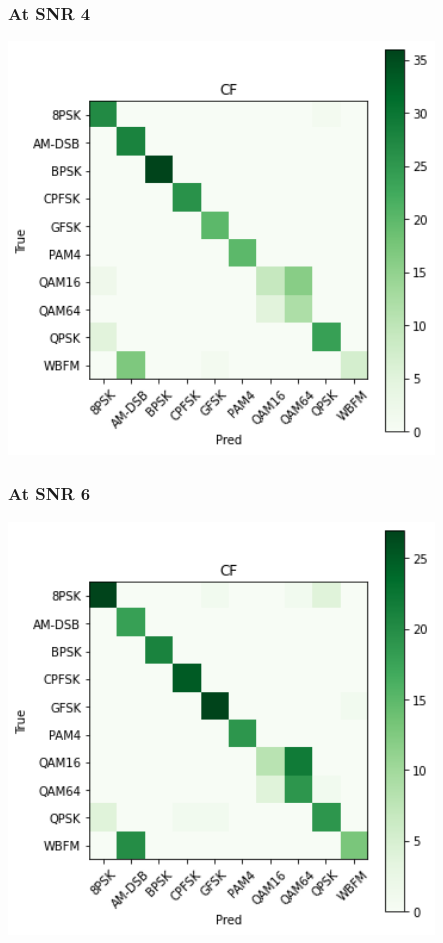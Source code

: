\documentclass[12pt,a4paper]{article}
\begin{document}
\subsubsection{At SNR 4}
\begin{center}
\includegraphics[width=320pt]{imgs/snrs/snr17.png}
\end{center}
\subsubsection{At SNR 6}
\begin{center}
\includegraphics[width=320pt]{imgs/snrs/snr18.png}
\end{center}
\end{document}
